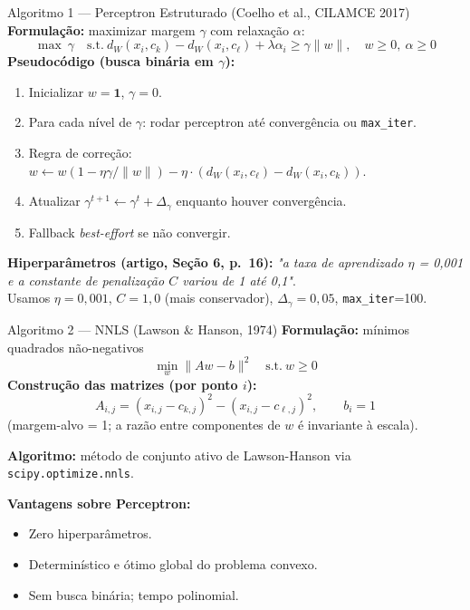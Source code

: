 \documentclass[aspectratio=169,10pt]{beamer}
\begin{document}
\begin{frame}{Algoritmo 1 --- Perceptron Estruturado (Coelho et al., CILAMCE 2017)}
  \scriptsize
  \textbf{Formula\c{c}\~ao:} maximizar margem $\gamma$ com relaxa\c{c}\~ao $\alpha$:
  \[ \max\ \gamma \quad \text{s.t.}\ d_W(x_i,c_k) - d_W(x_i,c_\ell) + \lambda\alpha_i \geq \gamma\|w\|, \quad w \geq 0,\ \alpha \geq 0 \]
  \textbf{Pseudoc\'odigo (busca bin\'aria em $\gamma$):}
  \begin{enumerate}\setlength\itemsep{0.05em}
    \item Inicializar $w = \mathbf{1}$, $\gamma = 0$.
    \item Para cada n\'ivel de $\gamma$: rodar perceptron at\'e converg\^encia ou \texttt{max\_iter}.
    \item Regra de corre\c{c}\~ao: $w \leftarrow w(1 - \eta\gamma/\|w\|) - \eta\cdot(d_W(x_i,c_\ell) - d_W(x_i,c_k))$.
    \item Atualizar $\gamma^{t+1} \leftarrow \gamma^t + \Delta_\gamma$ enquanto houver converg\^encia.
    \item Fallback \emph{best-effort} se n\~ao convergir.
  \end{enumerate}
  \medskip
  \textbf{Hiperpar\^ametros (artigo, Se\c{c}\~ao 6, p.\ 16):}
  \emph{"a taxa de aprendizado $\eta$ = 0,001 e a constante de penaliza\c{c}\~ao $C$ variou de 1 at\'e 0,1"}.\\
  Usamos $\eta = 0{,}001$, $C = 1{,}0$ (mais conservador), $\Delta_\gamma = 0{,}05$, \texttt{max\_iter}=100.
\end{frame}

\begin{frame}{Algoritmo 2 --- NNLS (Lawson \& Hanson, 1974)}
  \scriptsize
  \textbf{Formula\c{c}\~ao:} m\'inimos quadrados n\~ao-negativos
  \[ \min_w \|Aw - b\|^2 \quad \text{s.t.}\ w \geq 0 \]
  \textbf{Constru\c{c}\~ao das matrizes (por ponto $i$):}
  \[ A_{i,j} = (x_{i,j} - c_{k,j})^2 - (x_{i,j} - c_{\ell,j})^2, \qquad b_i = 1 \]
  (margem-alvo = 1; a raz\~ao entre componentes de $w$ \'e invariante \`a escala).
  \medskip

  \textbf{Algoritmo:} m\'etodo de conjunto ativo de Lawson-Hanson via \texttt{scipy.optimize.nnls}.
  \medskip

  \textbf{Vantagens sobre Perceptron:}
  \begin{itemize}
    \item Zero hiperpar\^ametros.
    \item Determin\'istico e \'otimo global do problema convexo.
    \item Sem busca bin\'aria; tempo polinomial.
  \end{itemize}
\end{frame}
\end{document}
